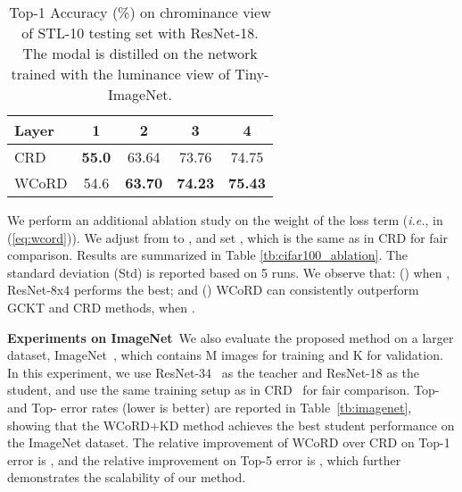 \documentclass[final]{cvpr}
\theoremstyle{definition}
\begin{document}
\begin{table}[t!]
\small
\begin{center}
    \caption{
    \small{CIFAR-100 test accuracy (\%) of student network ResNet-8x4 with different weights on the local knowledge transfer term. The teacher network is ResNet-32x4.}
    }
\label{tb:cifar100_ablation}
\end{center}
\vspace{-4mm}
\end{table} \begin{table}[t!]
\small
\begin{center}
\begin{tabular}{l|cccc}
\toprule
 Layer  & 1 & 2 & 3 & 4 \\
\midrule
CRD & \textbf{55.0} & 63.64 & 73.76    & 74.75    \\
WCoRD & 54.6 & \textbf{63.70}   & \textbf{74.23}    & \textbf{75.43} \\

\bottomrule
\end{tabular}
\caption{
    \small{Top-1 Accuracy (\%) on chrominance view of STL-10 testing set with ResNet-18. The modal is distilled on the network trained with the luminance view of Tiny-ImageNet. }
    }
\label{tb:crossmodal}
\end{center}
\vspace{-7mm}
\end{table} We perform an additional ablation study on the weight of the  loss term (\emph{i.e.},  in (\ref{eq:wcord})). We adjust  from  to , and set , which is the same as in CRD for fair comparison.
  Results are summarized in Table \ref{tb:cifar100_ablation}. The standard deviation (Std) is reported based on 5 runs.
We observe that:
() when , ResNet-8x4 performs the best; and () WCoRD can consistently outperform GCKT and CRD methods, when . 

\vspace{5pt}
\noindent\textbf{Experiments on ImageNet}\,
We also evaluate the proposed method on a larger dataset,
ImageNet~\cite{deng2009imagenet}, which contains M images for training and K for validation.
In this experiment, we use ResNet-34~\cite{he2016deep} as the teacher and ResNet-18 as the student, and use the same training setup as in CRD~\cite{tian2019contrastive} for fair comparison.
Top- and Top- error rates (lower is better) are reported in Table~\ref{tb:imagenet}, showing that the 
WCoRD+KD method achieves the best student performance on the ImageNet dataset.
The relative improvement of WCoRD over CRD on Top-1 error is , and the relative improvement on Top-5 error is , which further
demonstrates the scalability of our method.
\end{document}
